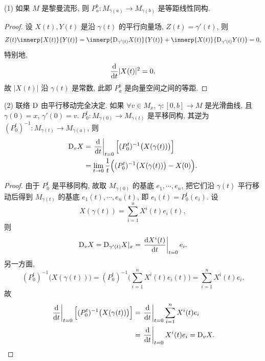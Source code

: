 \begin{remark}
  (1) 如果 $M$ 是黎曼流形, 则 $P_a^b: M_{\gamma(a)}\longrightarrow M_{\gamma(b)}$
  是等距线性同构.
  \begin{proof}
    设 $X(t), Y(t)$ 是沿 $\gamma(t)$ 的平行向量场, $Z(t)=\gamma'(t)$, 则
    \[Z(t)\innerp{X(t)}{Y(t)} = \innerp{\D_{\gamma'(t)}X(t)}{Y(t)}
    + \innerp{X(t)}{\D_{\gamma'(t)}Y(t)} = 0,\]
    特别地,
    \[\frac{\mathop{}\!\mathrm{d}}{\mathop{}\!\mathrm{d} t} |X(t)|^2 = 0,\]
    故 $|X(t)|$ 沿 $\gamma(t)$ 是常数, 此即 $P_a^b$ 是向量空间之间的等距.
  \end{proof}

  (2) 联络 $\mathrm{D}$ 由平行移动完全决定. 如果 $\forall v\in M_x$,
  $\gamma\colon [0,b]\to M$ 是光滑曲线, 且 $\gamma(0)=x$, $\gamma'(0)=v$.
  $P_0^t\colon M_{\gamma(0)}\to M_{\gamma(t)}$ 是平移同构,
  其逆为 $(P_0^t)^{-1}\colon M_{\gamma(t)}\to M_{\gamma(a)}$, 则
  \begin{align*}
    \mathrm{D}_v X
    & = \left.\frac{\mathop{}\!\mathrm{d}}{\mathop{}\!\mathrm{d} t}\right|_{t=0} \Bigl[(P_0^t)^{-1} \bigl(X(\gamma(t))\bigr)\Bigr] \\
    & = \lim_{t\to 0}\frac{1}{t} \Bigl((P_0^t)^{-1}\bigl(X(\gamma(t))\bigr) - X(0)\Bigr).
  \end{align*}
  \begin{proof}
    由于 $P_0^t$ 是平移同构, 故取 $M_{\gamma(0)}$ 的基底 $e_1,\cdots,e_n$,
    把它们沿 $\gamma(t)$ 平行移动后得到 $M_{\gamma(t)}$ 的基底
    $e_1(t),\cdots,e_n(t)$, 即 $e_i(t)=P_0^t(e_i)$. 设
    \[X(\gamma(t)) = \sum_{i=1}^n X^i(t)e_i(t),\]
    则
    \[\mathrm{D}_v X = \mathrm{D}_{\gamma'(t)} X|_x = \left.\frac{\mathop{}\!\mathrm{d} X^i(t)}{\mathop{}\!\mathrm{d} t}\right|_{t=0} e_i.\]
    另一方面,
    \[(P_0^t)^{-1}\bigl(X(\gamma(t))\bigr) 
    = (P_0^t)^{-1} \biggl(\sum_{i=1}^n X^i(t)e_i(t)\biggr) = \sum_{i=1}^n X^i(t)e_i.\]
    故
    \begin{align*}
      \left.\frac{\mathop{}\!\mathrm{d}}{\mathop{}\!\mathrm{d} t}\right|_{t=0}\Bigl[(P_0^t)^{-1} \bigl(X(\gamma(t))\bigr)\Bigr]
      & = \left.\frac{\mathop{}\!\mathrm{d}}{\mathop{}\!\mathrm{d} t}\right|_{t=0} \sum_{i=1}^n X^i(t)e_i \\
      & = \left.\frac{\mathop{}\!\mathrm{d}}{\mathop{}\!\mathrm{d} t}\right|_{t=0} X^i(t)e_i = \mathrm{D}_v X.\qedhere
    \end{align*}
  \end{proof}
\end{remark}
